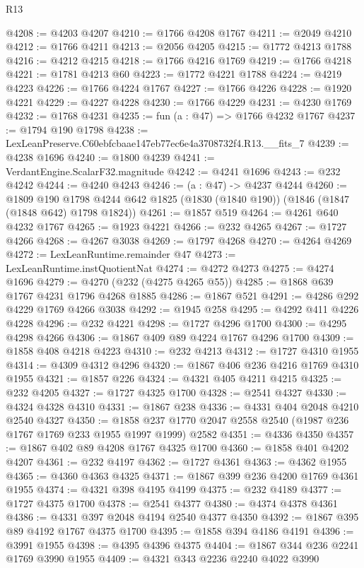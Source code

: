 \begin{lexlean}{R13}
\begin{coremodule}
@4208 := @4203 @4207
@4210 := @1766 @4208 @1767
@4211 := @2049 @4210
@4212 := @1766 @4211
@4213 := @2056 @4205
@4215 := @1772 @4213 @1788
@4216 := @4212 @4215
@4218 := @1766 @4216 @1769
@4219 := @1766 @4218
@4221 := @1781 @4213 @60
@4223 := @1772 @4221 @1788
@4224 := @4219 @4223
@4226 := @1766 @4224 @1767
@4227 := @1766 @4226
@4228 := @1920 @4221
@4229 := @4227 @4228
@4230 := @1766 @4229
@4231 := @4230 @1769
@4232 := @1768 @4231
@4235 := fun (a : @47) => @1766 @4232 @1767
@4237 := @1794 @190 @1798
@4238 := LexLeanPreserve.C60ebfcbaae147eb77ec6e4a3708732f4.R13.__fits_7
@4239 := @4238 @1696
@4240 := @1800 @4239
@4241 := VerdantEngine.ScalarF32.magnitude
@4242 := @4241 @1696
@4243 := @232 @4242
@4244 := @4240 @4243
@4246 := (a : @47) -> @4237 @4244
@4260 := @1809
    @190
    @1798
    @4244
    @642
    @1825
    (@1830 (@1840 @190))
    (@1846 (@1847 (@1848 @642) @1798 @1824))
@4261 := @1857 @519
@4264 := @4261 @640 @4232 @1767
@4265 := @1923 @4221
@4266 := @232 @4265
@4267 := @1727 @4266
@4268 := @4267 @3038
@4269 := @1797 @4268
@4270 := @4264 @4269
@4272 := LexLeanRuntime.remainder @47
@4273 := LexLeanRuntime.instQuotientNat
@4274 := @4272 @4273
@4275 := @4274 @1696
@4279 := @4270 (@232 (@4275 @4265 @55))
@4285 := @1868 @639 @1767 @4231 @1796 @4268 @1885
@4286 := @1867 @521
@4291 := @4286 @292 @4229 @1769 @4266 @3038
@4292 := @1945 @258
@4295 := @4292 @411 @4226 @4228
@4296 := @232 @4221
@4298 := @1727 @4296 @1700
@4300 := @4295 @4298 @4266
@4306 := @1867 @409 @89 @4224 @1767 @4296 @1700
@4309 := @1858 @408 @4218 @4223
@4310 := @232 @4213
@4312 := @1727 @4310 @1955
@4314 := @4309 @4312 @4296
@4320 := @1867 @406 @236 @4216 @1769 @4310 @1955
@4321 := @1857 @226
@4324 := @4321 @405 @4211 @4215
@4325 := @232 @4205
@4327 := @1727 @4325 @1700
@4328 := @2541 @4327
@4330 := @4324 @4328 @4310
@4331 := @1867 @238
@4336 := @4331 @404 @2048 @4210 @2540 @4327
@4350 := @1858 @237 @1770 @2047 @2558 @2540 (@1987 @236 @1767 @1769 @233 @1955 @1997 @1999) @2582
@4351 := @4336 @4350
@4357 := @1867 @402 @89 @4208 @1767 @4325 @1700
@4360 := @1858 @401 @4202 @4207
@4361 := @232 @4197
@4362 := @1727 @4361
@4363 := @4362 @1955
@4365 := @4360 @4363 @4325
@4371 := @1867 @399 @236 @4200 @1769 @4361 @1955
@4374 := @4321 @398 @4195 @4199
@4375 := @232 @4189
@4377 := @1727 @4375 @1700
@4378 := @2541 @4377
@4380 := @4374 @4378 @4361
@4386 := @4331 @397 @2048 @4194 @2540 @4377 @4350
@4392 := @1867 @395 @89 @4192 @1767 @4375 @1700
@4395 := @1858 @394 @4186 @4191
@4396 := @3991 @1955
@4398 := @4395 @4396 @4375
@4404 := @1867 @344 @236 @2241 @1769 @3990 @1955
@4409 := @4321 @343 @2236 @2240 @4022 @3990

\end{coremodule}
\end{lexlean}
